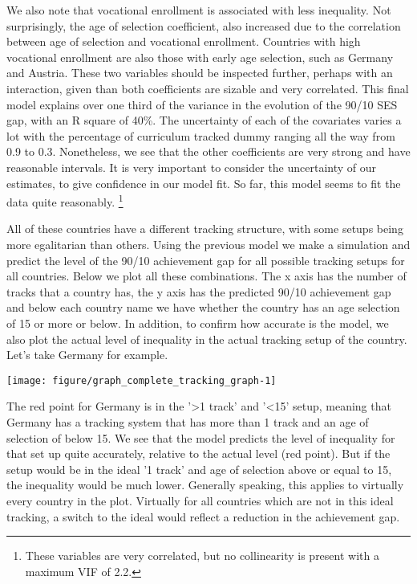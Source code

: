\documentclass[11pt, a4paper]{article}\usepackage[]{graphicx}\usepackage[]{color}
\begin{document}
We also note that vocational enrollment is associated with less inequality. Not surprisingly, the age of selection coefficient, also increased due to the correlation between age of selection and vocational enrollment. Countries with high vocational enrollment are also those with early age selection, such as Germany and Austria. These two variables should be inspected further, perhaps with an interaction, given than both coefficients are sizable and very correlated. This final model explains over one third of the variance in the evolution of the 90/10 SES gap, with an R square of 40\%. The uncertainty of each of the covariates varies a lot with the percentage of curriculum tracked dummy ranging all the way from 0.9 to 0.3. Nonetheless, we see that the other coefficients are very strong and have reasonable intervals. It is very important to consider the uncertainty of our estimates, to give confidence in our model fit. So far, this model seems to fit the data quite reasonably. \footnote{These variables are very correlated, but no collinearity is present with a maximum VIF of 2.2.}

All of these countries have a different tracking structure, with some setups being more egalitarian than others. Using the previous model we make a simulation and predict the level of the 90/10 achievement gap for all possible tracking setups for all countries. Below we plot all these combinations. The x axis has the number of tracks that a country has, the y axis has the predicted 90/10 achievement gap and below each country name we have whether the country has an age selection of 15 or more or below. In addition, to confirm how accurate is the model, we also plot the actual level of inequality in the actual tracking setup of the country. Let's take Germany for example.





{\centering \texttt{[image: figure/graph\_complete\_tracking\_graph-1]} 

}




The red point for Germany is in the '\textgreater 1 track' and '\textless 15' setup, meaning that Germany has a tracking system that has more than 1 track and an age of selection of below 15. We see that the model predicts the level of inequality for that set up quite accurately, relative to the actual level (red point). But if the setup would be in the ideal '1 track' and age of selection above or equal to 15, the inequality would be much lower. Generally speaking, this applies to virtually every country in the plot. Virtually for all countries which are not in this ideal tracking, a switch to the ideal would reflect a reduction in the achievement gap.
\end{document}
